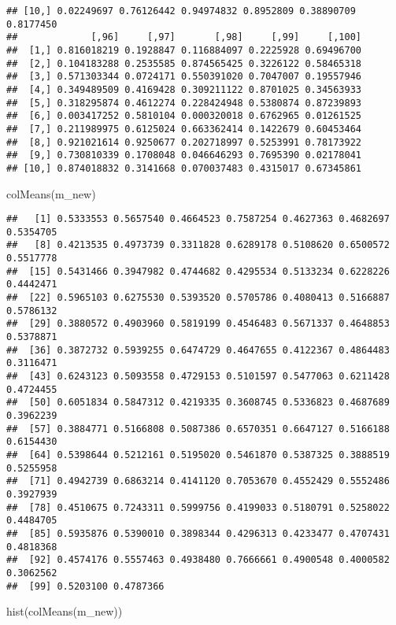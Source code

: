 \documentclass[
]{article}
\newenvironment{Shaded}{\begin{snugshade}}{\end{snugshade}}
\newcommand{\FunctionTok}[1]{\textcolor[rgb]{0.00,0.00,0.00}{#1}}
\newcommand{\NormalTok}[1]{#1}
\begin{document}
\begin{verbatim}
## [10,] 0.02249697 0.76126442 0.94974832 0.8952809 0.38890709 0.8177450
##             [,96]     [,97]       [,98]     [,99]     [,100]
##  [1,] 0.816018219 0.1928847 0.116884097 0.2225928 0.69496700
##  [2,] 0.104183288 0.2535585 0.874565425 0.3226122 0.58465318
##  [3,] 0.571303344 0.0724171 0.550391020 0.7047007 0.19557946
##  [4,] 0.349489509 0.4169428 0.309211122 0.8701025 0.34563933
##  [5,] 0.318295874 0.4612274 0.228424948 0.5380874 0.87239893
##  [6,] 0.003417252 0.5810104 0.000320018 0.6762965 0.01261525
##  [7,] 0.211989975 0.6125024 0.663362414 0.1422679 0.60453464
##  [8,] 0.921021614 0.9250677 0.202718997 0.5253991 0.78173922
##  [9,] 0.730810339 0.1708048 0.046646293 0.7695390 0.02178041
## [10,] 0.874018832 0.3141668 0.070037483 0.4315017 0.67345861
\end{verbatim}

\begin{Shaded}
\begin{Highlighting}[]
\FunctionTok{colMeans}\NormalTok{(m\_new)}
\end{Highlighting}
\end{Shaded}

\begin{verbatim}
##   [1] 0.5333553 0.5657540 0.4664523 0.7587254 0.4627363 0.4682697 0.5354705
##   [8] 0.4213535 0.4973739 0.3311828 0.6289178 0.5108620 0.6500572 0.5517778
##  [15] 0.5431466 0.3947982 0.4744682 0.4295534 0.5133234 0.6228226 0.4442471
##  [22] 0.5965103 0.6275530 0.5393520 0.5705786 0.4080413 0.5166887 0.5786132
##  [29] 0.3880572 0.4903960 0.5819199 0.4546483 0.5671337 0.4648853 0.5378871
##  [36] 0.3872732 0.5939255 0.6474729 0.4647655 0.4122367 0.4864483 0.3116471
##  [43] 0.6243123 0.5093558 0.4729153 0.5101597 0.5477063 0.6211428 0.4724455
##  [50] 0.6051834 0.5847312 0.4219335 0.3608745 0.5336823 0.4687689 0.3962239
##  [57] 0.3884771 0.5166808 0.5087386 0.6570351 0.6647127 0.5166188 0.6154430
##  [64] 0.5398644 0.5212161 0.5195020 0.5461870 0.5387325 0.3888519 0.5255958
##  [71] 0.4942739 0.6863214 0.4141120 0.7053670 0.4552429 0.5552486 0.3927939
##  [78] 0.4510675 0.7243311 0.5999756 0.4199033 0.5180791 0.5258022 0.4484705
##  [85] 0.5935876 0.5390010 0.3898344 0.4296313 0.4233477 0.4707431 0.4818368
##  [92] 0.4574176 0.5557463 0.4938480 0.7666661 0.4900548 0.4000582 0.3062562
##  [99] 0.5203100 0.4787366
\end{verbatim}

\begin{Shaded}
\begin{Highlighting}[]
\FunctionTok{hist}\NormalTok{(}\FunctionTok{colMeans}\NormalTok{(m\_new))  }
\end{Highlighting}
\end{Shaded}
\end{document}
